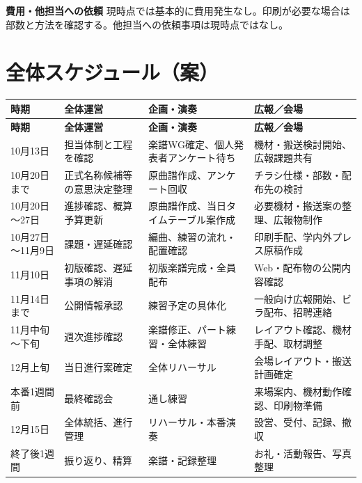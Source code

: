 \documentclass[uplatex,dvipdfmx,a4paper,11pt]{jsarticle}
\begin{document}
\par\medskip\noindent\textbf{費用・他担当への依頼}\quad
現時点では基本的に費用発生なし。印刷が必要な場合は部数と方法を確認する。他担当への依頼事項は現時点ではなし。

\section{全体スケジュール（案）}

\begin{longtable}{@{}L{25mm}L{38mm}L{45mm}L{45mm}@{}}
  \toprule
  \textbf{時期} & \textbf{全体運営} & \textbf{企画・演奏} & \textbf{広報／会場} \\
  \midrule
  \endfirsthead
  \toprule
  \textbf{時期} & \textbf{全体運営} & \textbf{企画・演奏} & \textbf{広報／会場} \\
  \midrule
  \endhead
  10月13日 & 担当体制と工程を確認 & 楽譜WG確定、個人発表者アンケート待ち & 機材・搬送検討開始、広報課題共有 \\
  10月20日まで & 正式名称候補等の意思決定整理 & 原曲譜作成、アンケート回収 & チラシ仕様・部数・配布先の検討 \\
  10月20日～27日 & 進捗確認、概算予算更新 & 原曲譜作成、当日タイムテーブル案作成 & 必要機材・搬送案の整理、広報物制作 \\
  10月27日～11月9日 & 課題・遅延確認 & 編曲、練習の流れ・配置確認 & 印刷手配、学内外プレス原稿作成 \\
  11月10日 & 初版確認、遅延事項の解消 & 初版楽譜完成・全員配布 & Web・配布物の公開内容確認 \\
  11月14日まで & 公開情報承認 & 練習予定の具体化 & 一般向け広報開始、ビラ配布、招聘連絡 \\
  11月中旬～下旬 & 週次進捗確認 & 楽譜修正、パート練習・全体練習 & レイアウト確認、機材手配、取材調整 \\
  12月上旬 & 当日進行案確定 & 全体リハーサル & 会場レイアウト・搬送計画確定 \\
  本番1週間前 & 最終確認会 & 通し練習 & 来場案内、機材動作確認、印刷物準備 \\
  12月15日 & 全体統括、進行管理 & リハーサル・本番演奏 & 設営、受付、記録、撤収 \\
  終了後1週間 & 振り返り、精算 & 楽譜・記録整理 & お礼・活動報告、写真整理 \\
  \bottomrule
\end{longtable}

\end{document}
